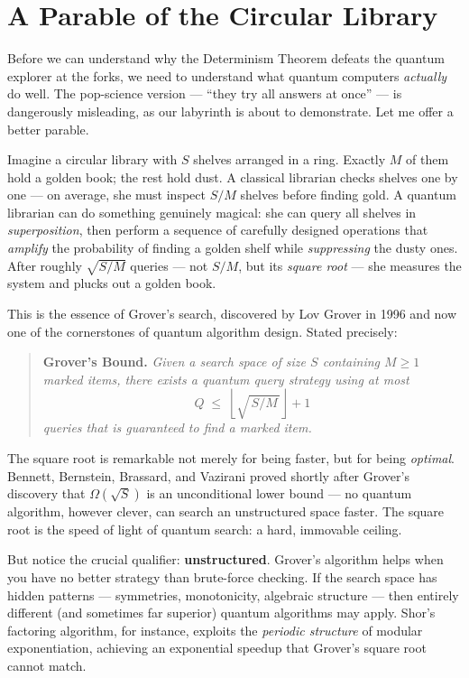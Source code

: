 \section{A Parable of the Circular Library}\label{ch7-a-parable-of-the-circular-library}

Before we can understand why the Determinism Theorem defeats the quantum explorer at the forks, we need to understand what quantum computers \emph{actually} do well. The pop-science version --- ``they try all answers at once'' --- is dangerously misleading, as our labyrinth is about to demonstrate. Let me offer a better parable.

Imagine a circular library with \(S\) shelves arranged in a ring. Exactly \(M\) of them hold a golden book; the rest hold dust. A classical librarian checks shelves one by one --- on average, she must inspect \(S / M\) shelves before finding gold. A quantum librarian can do something genuinely magical: she can query all shelves in \emph{superposition}, then perform a sequence of carefully designed operations that \emph{amplify} the probability of finding a golden shelf while \emph{suppressing} the dusty ones. After roughly \(\sqrt{S / M}\) queries --- not \(S / M\), but its \emph{square root} --- she measures the system and plucks out a golden book.

This is the essence of Grover's search, discovered by Lov Grover in 1996 and now one of the cornerstones of quantum algorithm design. Stated precisely:

\begin{quote}
\textbf{Grover's Bound.} \emph{Given a search space of size \(S\) containing \(M \geq 1\) marked items, there exists a quantum query strategy using at most} \[Q \;\leq\; \left\lfloor \sqrt{\,S / M\,} \right\rfloor + 1\] \emph{queries that is guaranteed to find a marked item.}
\end{quote}

The square root is remarkable not merely for being faster, but for being \emph{optimal}. Bennett, Bernstein, Brassard, and Vazirani proved shortly after Grover's discovery that \(\Omega(\sqrt{S})\) is an unconditional lower bound --- no quantum algorithm, however clever, can search an unstructured space faster. The square root is the speed of light of quantum search: a hard, immovable ceiling.

But notice the crucial qualifier: \textbf{unstructured}. Grover's algorithm helps when you have no better strategy than brute-force checking. If the search space has hidden patterns --- symmetries, monotonicity, algebraic structure --- then entirely different (and sometimes far superior) quantum algorithms may apply. Shor's factoring algorithm, for instance, exploits the \emph{periodic structure} of modular exponentiation, achieving an exponential speedup that Grover's square root cannot match.


